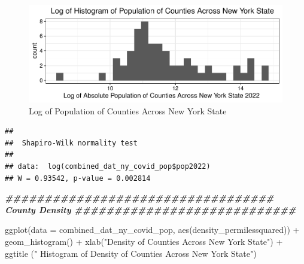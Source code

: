 \documentclass[
  12pt,
]{article}
\newenvironment{Shaded}{\begin{snugshade}}{\end{snugshade}}
\newcommand{\AttributeTok}[1]{\textcolor[rgb]{0.77,0.63,0.00}{#1}}
\newcommand{\CommentTok}[1]{\textcolor[rgb]{0.56,0.35,0.01}{\textit{#1}}}
\newcommand{\DocumentationTok}[1]{\textcolor[rgb]{0.56,0.35,0.01}{\textbf{\textit{#1}}}}
\newcommand{\FunctionTok}[1]{\textcolor[rgb]{0.00,0.00,0.00}{#1}}
\newcommand{\NormalTok}[1]{#1}
\newcommand{\SpecialCharTok}[1]{\textcolor[rgb]{0.00,0.00,0.00}{#1}}
\newcommand{\StringTok}[1]{\textcolor[rgb]{0.31,0.60,0.02}{#1}}
\begin{document}
\begin{figure}

\includegraphics{EDA_Final_Group_Project_files/figure-latex/unnamed-chunk-9-1} \hfill{}

\caption{Log of Population of Counties Across New York State}\label{fig:unnamed-chunk-9}
\end{figure}

\begin{Shaded}
\end{Shaded}

\begin{verbatim}
## 
##  Shapiro-Wilk normality test
## 
## data:  log(combined_dat_ny_covid_pop$pop2022)
## W = 0.93542, p-value = 0.002814
\end{verbatim}

\begin{Shaded}
\begin{Highlighting}[]
\DocumentationTok{\#\#\#\#\#\#\#\#\#\#\#\#\#\#\#\#\#\#\#\#\#\#\#\#\#\#\#\#\#\#\#\#\#\# County Density \#\#\#\#\#\#\#\#\#\#\#\#\#\#\#\#\#\#\#\#\#\#\#\#\#\#\#\#}

\FunctionTok{ggplot}\NormalTok{(}\AttributeTok{data =}\NormalTok{ combined\_dat\_ny\_covid\_pop, }\FunctionTok{aes}\NormalTok{(density\_permilessquared)) }\SpecialCharTok{+}
  \FunctionTok{geom\_histogram}\NormalTok{() }\SpecialCharTok{+}
  \FunctionTok{xlab}\NormalTok{(}\StringTok{"Density of Counties Across New York State"}\NormalTok{) }\SpecialCharTok{+}
  \FunctionTok{ggtitle}\NormalTok{ (}\StringTok{" Histogram of Density of Counties Across New York State"}\NormalTok{)}
\end{Highlighting}
\end{Shaded}
\end{document}

